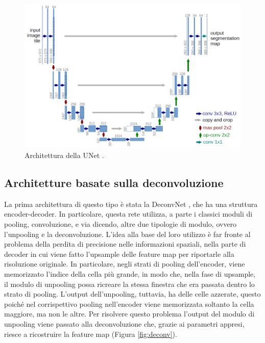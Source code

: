  \begin{figure}[h!]
    \centering
    \hspace*{0.1in}
    \includegraphics[scale=0.22]{img/unet.png}
    \caption{Architettura della UNet \cite{unet}.}
    \label{fig:unet}
\end{figure}
 
 
\subsection{Architetture basate sulla deconvoluzione}
La prima architettura di questo tipo è stata la DeconvNet \cite{deconvnet}, che ha una struttura encoder-decoder. In particolare, questa rete utilizza, a parte i classici moduli di pooling, convoluzione, e via dicendo, altre due tipologie di modulo, ovvero l'unpooling e la deconvoluzione. L'idea alla base del loro utilizzo è far fronte al problema della perdita di precisione nelle informazioni spaziali, nella parte di decoder in cui viene fatto l'upsample delle feature map per riportarle alla risoluzione originale. In particolare, negli strati di pooling dell'encoder, viene memorizzato l'indice della cella più grande, in modo che, nella fase di upsample, il modulo di unpooling possa ricreare la stessa finestra che era passata dentro lo strato di pooling. L'output dell'unpooling, tuttavia, ha delle celle azzerate, questo poiché nel corrispettivo pooling nell'encoder viene memorizzata soltanto la cella maggiore, ma non le altre. Per risolvere questo problema l'output del modulo di unpooling viene passato alla deconvoluzione che, grazie ai parametri appresi, riesce a ricostruire la feature map (Figura \ref{fig:deconv}).
 
